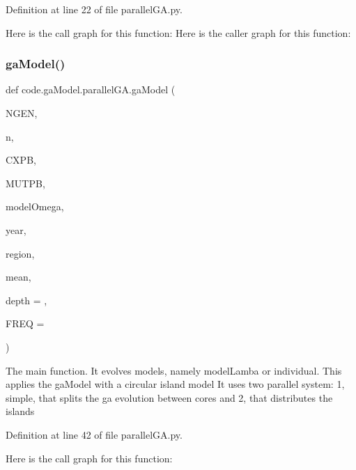 Definition at line 22 of file parallel\+G\+A.\+py.

Here is the call graph for this function\+:
Here is the caller graph for this function\+:
\mbox{\label{namespacecode_1_1ga_model_1_1parallel_g_a_a703bc172bcc6b29b3e7d5853daaf547c}} 
\subsubsection{\texorpdfstring{ga\+Model()}{gaModel()}}
{\footnotesize\ttfamily def code.\+ga\+Model.\+parallel\+G\+A.\+ga\+Model (\begin{DoxyParamCaption}\item[{}]{N\+G\+EN,  }\item[{}]{n,  }\item[{}]{C\+X\+PB,  }\item[{}]{M\+U\+T\+PB,  }\item[{}]{model\+Omega,  }\item[{}]{year,  }\item[{}]{region,  }\item[{}]{mean,  }\item[{}]{depth = {},  }\item[{}]{F\+R\+EQ = {} }\end{DoxyParamCaption})}

\begin{DoxyVerb}The main function. It evolves models, namely modelLamba or individual. 
This applies the gaModel with a circular island model
It uses two parallel system: 1, simple, that splits the ga evolution between cores
and 2, that distributes the islands
\end{DoxyVerb}
 

Definition at line 42 of file parallel\+G\+A.\+py.

Here is the call graph for this function\+:
